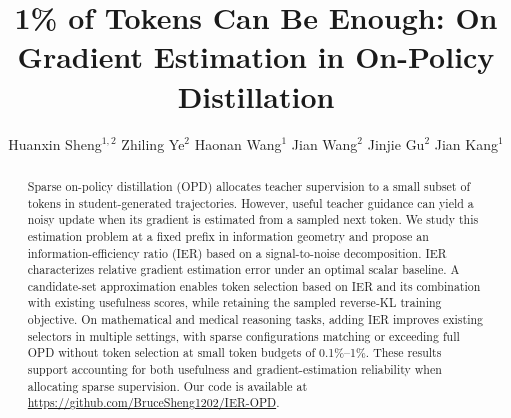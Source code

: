 \documentclass[]{antgroup}
\title{1\% of Tokens Can Be Enough: On Gradient Estimation in On-Policy Distillation}
\author{\centering
Huanxin Sheng$^{1,2}$ \quad
Zhiling Ye$^{2}$ \quad
Haonan Wang$^{1}$ \quad
Jian Wang$^{2}$ \quad
Jinjie Gu$^{2}$ \quad
Jian Kang$^{1}$
}
\affiliation{$^1$MBZUAI, $^2$Ant Group \\ \vspace{.5em} \{huanxin.sheng, jian.kang\}@mbzuai.ac.ae}
\theoremstyle{definition}
\theoremstyle{remark}
\begin{document}
\maketitle

\begin{abstract}
Sparse on-policy distillation (OPD) allocates teacher supervision to a small subset of tokens in student-generated trajectories. However, useful teacher guidance can yield a noisy update when its gradient is estimated from a sampled next token. We study this estimation problem at a fixed prefix in information geometry and propose an information-efficiency ratio (IER) based on a signal-to-noise decomposition. IER characterizes relative gradient estimation error under an optimal scalar baseline. A candidate-set approximation enables token selection based on IER and its combination with existing usefulness scores, while retaining the sampled reverse-KL training objective. On mathematical and medical reasoning tasks, adding IER improves existing selectors in multiple settings, with sparse configurations matching or exceeding full OPD without token selection at small token budgets of 0.1\%--1\%. These results support accounting for both usefulness and gradient-estimation reliability when allocating sparse supervision. Our code is available at \url{https://github.com/BruceSheng1202/IER-OPD}.
\end{abstract}











\appendix




\end{document}
